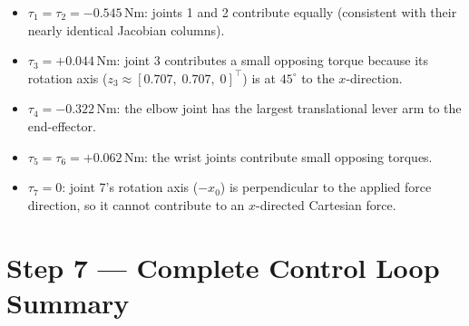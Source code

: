 \begin{itemize}
  \item $\tau_1 = \tau_2 = -0.545\,\mathrm{Nm}$:
        joints 1 and 2 contribute equally (consistent with their
        nearly identical Jacobian columns).
  \item $\tau_3 = +0.044\,\mathrm{Nm}$:
        joint 3 contributes a small opposing torque because its rotation
        axis ($z_3 \approx [0.707,\;0.707,\;0]^\top$) is
        at $45^\circ$ to the $x$-direction.
  \item $\tau_4 = -0.322\,\mathrm{Nm}$:
        the elbow joint has the largest
        translational lever arm to the end-effector.
  \item $\tau_5 = \tau_6 = +0.062\,\mathrm{Nm}$:
        the wrist joints contribute small opposing torques.
  \item $\tau_7 = 0$:
        joint 7's rotation axis ($-x_0$) is perpendicular to the
        applied force direction, so it cannot contribute to an $x$-directed
        Cartesian force.
\end{itemize}

\section{Step 7 --- Complete Control Loop Summary}
\label{app:panda_loop}

